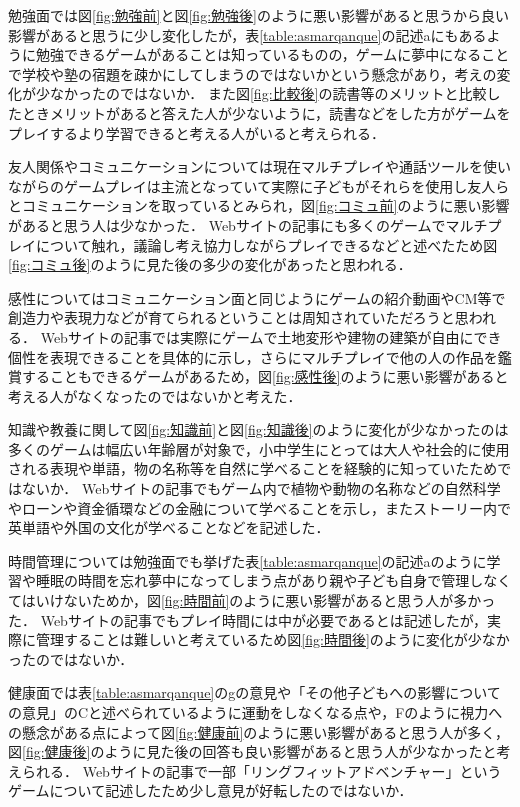 \documentclass[12pt,a4j,titlepage]{ltjsarticle}
\begin{document}
勉強面では図\ref{fig:勉強前}と図\ref{fig:勉強後}のように悪い影響があると思うから良い影響があると思うに少し変化したが，表\ref{table:asmarqanque}の記述aにもあるように勉強できるゲームがあることは知っているものの，ゲームに夢中になることで学校や塾の宿題を疎かにしてしまうのではないかという懸念があり，考えの変化が少なかったのではないか．
また図\ref{fig:比較後}の読書等のメリットと比較したときメリットがあると答えた人が少ないように，読書などをした方がゲームをプレイするより学習できると考える人がいると考えられる．

友人関係やコミュニケーションについては現在マルチプレイや通話ツールを使いながらのゲームプレイは主流となっていて実際に子どもがそれらを使用し友人らとコミュニケーションを取っているとみられ，図\ref{fig:コミュ前}のように悪い影響があると思う人は少なかった．
Webサイトの記事にも多くのゲームでマルチプレイについて触れ，議論し考え協力しながらプレイできるなどと述べたため図\ref{fig:コミュ後}のように見た後の多少の変化があったと思われる．

感性についてはコミュニケーション面と同じようにゲームの紹介動画やCM等で創造力や表現力などが育てられるということは周知されていただろうと思われる．
Webサイトの記事では実際にゲームで土地変形や建物の建築が自由にでき個性を表現できることを具体的に示し，さらにマルチプレイで他の人の作品を鑑賞することもできるゲームがあるため，図\ref{fig:感性後}のように悪い影響があると考える人がなくなったのではないかと考えた．

知識や教養に関して図\ref{fig:知識前}と図\ref{fig:知識後}のように変化が少なかったのは多くのゲームは幅広い年齢層が対象で，小中学生にとっては大人や社会的に使用される表現や単語，物の名称等を自然に学べることを経験的に知っていたためではないか．
Webサイトの記事でもゲーム内で植物や動物の名称などの自然科学やローンや資金循環などの金融について学べることを示し，またストーリー内で英単語や外国の文化が学べることなどを記述した．

時間管理については勉強面でも挙げた表\ref{table:asmarqanque}の記述aのように学習や睡眠の時間を忘れ夢中になってしまう点があり親や子ども自身で管理しなくてはいけないためか，図\ref{fig:時間前}のように悪い影響があると思う人が多かった．
Webサイトの記事でもプレイ時間には中が必要であるとは記述したが，実際に管理することは難しいと考えているため図\ref{fig:時間後}のように変化が少なかったのではないか．

健康面では表\ref{table:asmarqanque}のgの意見や「その他子どもへの影響についての意見」のCと述べられているように運動をしなくなる点や，Fのように視力への懸念がある点によって図\ref{fig:健康前}のように悪い影響があると思う人が多く，図\ref{fig:健康後}のように見た後の回答も良い影響があると思う人が少なかったと考えられる．
Webサイトの記事で一部「リングフィットアドベンチャー」というゲームについて記述したため少し意見が好転したのではないか．
\end{document}
